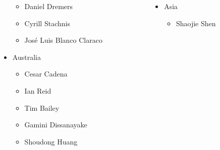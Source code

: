 \begin{frame}
\begin{columns}[T]
\begin{column}{.3\textwidth}
\begin{itemize}
\begin{itemize}
                    \item Daniel Dremers
                    \item Cyrill Stachnis
                    \item José Luis Blanco Claraco
                \end{itemize}
                \item Australia
                \begin{itemize}
                    \item Cesar Cadena
                    \item Ian Reid
                    \item Tim Bailey
                    \item Gamini Dissanayake
                    \item Shoudong Huang
                \end{itemize}
            \end{itemize}
        \end{column}%
    \hfill%
    \begin{column}{.3\textwidth}
        \begin{itemize} 
            \item Asia
            \begin{itemize}     
                \item Shaojie Shen
            \end{itemize}
        \end{itemize}
    \end{column}%
    \end{columns}    
\end{frame}


